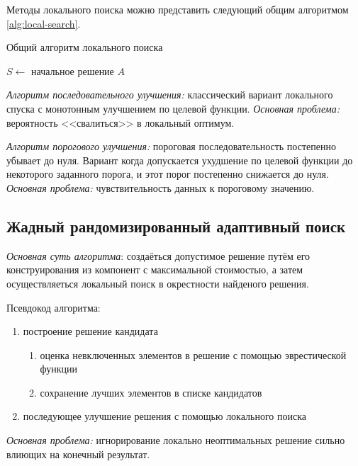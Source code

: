 Методы локального поиска можно представить следующий общим алгоритмом \ref{alg:local-search}.
\begin{algorithm}[ht!]
    \caption{Общий алгоритм локального поиска}
    \( S \leftarrow \) начальное решение \( A \)\;
    \label{alg:local-search}
\end{algorithm}

\emph{Алгоритм последовательного улучшения:} классический вариант локального спуска с монотонным 
улучшением по целевой функции. \emph{Основная проблема:} вероятность <<свалиться>> в локальный оптимум.

\emph{Алгоритм порогового улучшения:} пороговая последовательность постепенно убывает до нуля. Вариант 
когда допускается ухудшение по целевой функции до некоторого заданного порога, и этот порог постепенно 
снижается до нуля. \emph{Основная проблема:} чувствительность данных к пороговому значению.

\subsection{Жадный рандомизированный адаптивный поиск}
\emph{Основная суть алгоритма}: создаёться допустимое решение путём его конструирования из компонент с 
максимальной стоимостью, а затем осуществляеться локальный поиск в окрестности найденого решения.

Псевдокод алгоритма:
\begin{enumerate}
    \item построение решение кандидата
    \begin{enumerate}
        \item оценка невключенных элементов в решение с помощью эврестической функции
        \item сохранение лучших элементов в списке кандидатов
    \end{enumerate}
    \item последующее улучшение решения с помощью локального поиска
\end{enumerate}

\emph{Основная проблема:} игнорирование локально неоптимальных решение сильно влиющих на конечный результат.

